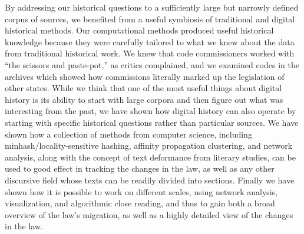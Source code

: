 \documentclass[12pt,]{article}
\begin{document}
By addressing our historical questions to a sufficiently large but
narrowly defined corpus of sources, we benefited from a useful symbiosis
of traditional and digital historical methods. Our computational methods
produced useful historical knowledge because they were carefully
tailored to what we knew about the data from traditional historical
work. We knew that code commissioners worked with ``the scissors and
paste-pot,'' as critics complained, and we examined codes in the
archives which showed how commissions literally marked up the
legislation of other states. While we think that one of the most useful
things about digital history is its ability to start with large corpora
and then figure out what was interesting from the past, we have shown
how digital history can also operate by starting with specific
historical questions rather than particular sources. We have shown how a
collection of methods from computer science, including
minhash/locality-sensitive hashing, affinity propagation clustering, and
network analysis, along with the concept of text deformance from
literary studies, can be used to good effect in tracking the changes in
the law, as well as any other discursive field whose texts can be
readily divided into sections. Finally we have shown how it is possible
to work on different scales, using network analysis, visualization, and
algorithmic close reading, and thus to gain both a broad overview of the
law's migration, as well as a highly detailed view of the changes in the
law.
\end{document}
